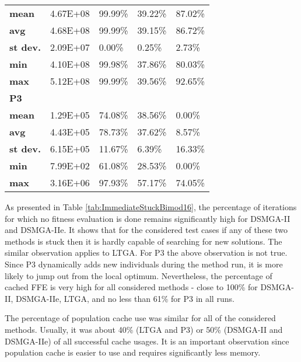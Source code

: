 \begin{table}[]
\begin{tabular}{lllll}
		\textbf{mean}                  & 4.67E+08      & 99.99\%             & 39.22\%                         & 87.02\% \\
		\textbf{avg}                   & 4.68E+08      & 99.99\%             & 39.15\%                         & 86.72\% \\
		\textbf{st dev.}               & 2.09E+07      & 0.00\%              & 0.25\%                          & 2.73\%  \\
		\textbf{min}                   & 4.10E+08      & 99.98\%             & 37.86\%                         & 80.03\% \\
		\textbf{max}                   & 5.12E+08      & 99.99\%             & 39.56\%                         & 92.65\% \\
		\midrule
		\textbf{P3} & & & & \\
		\textbf{mean}                  & 1.29E+05      & 74.08\%             & 38.56\%                         & 0.00\%  \\
		\textbf{avg}                   & 4.43E+05      & 78.73\%             & 37.62\%                         & 8.57\%  \\
		\textbf{st dev.}               & 6.15E+05      & 11.67\%             & 6.39\%                          & 16.33\% \\
		\textbf{min}                   & 7.99E+02      & 61.08\%             & 28.53\%                         & 0.00\%  \\
		\textbf{max}                   & 3.16E+06      & 97.93\%             & 57.17\%                         & 74.05\% \\
		\bottomrule
	\end{tabular}
\end{table}

As presented in Table \ref{tab:ImmediateStuckBimod16}, the percentage of iterations for which no fitness evaluation is done remains significantly high for DSMGA-II and DSMGA-IIe. It shows that for the considered test cases if any of these two methods is stuck then it is hardly capable of searching for new solutions. The similar observation applies to LTGA. For P3 the above observation is not true. Since P3 dynamically adds new individuals during the method run, it is more likely to jump out from the local optimum. Nevertheless, the percentage of cached FFE is very high for all considered methods - close to 100\% for DSMGA-II, DSMGA-IIe, LTGA, and no less than 61\% for P3 in all runs.\par

The percentage of population cache use was similar for all of the considered methods. Usually, it was about 40\% (LTGA and P3) or 50\% (DSMGA-II and DSMGA-IIe) of all successful cache usages. It is an important observation since population cache is easier to use and requires significantly less memory.\par

